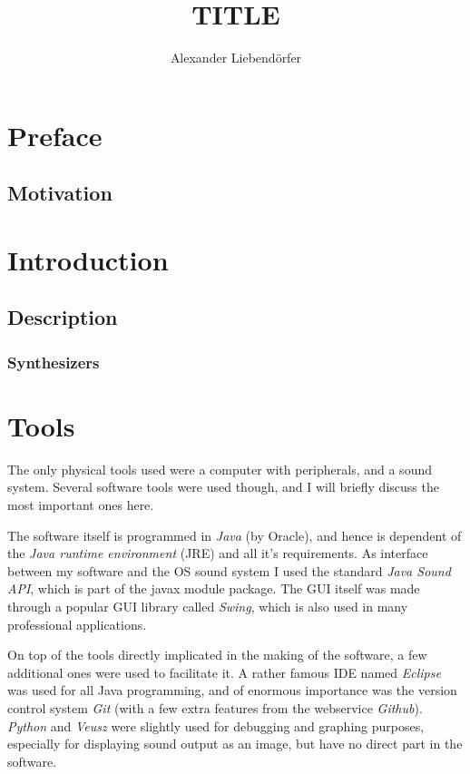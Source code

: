 \documentclass[11pt,a4paper]{article}
\title{\LARGE \textbf {TITLE} \vspace{1em}}
\author{Alexander Liebend\"{o}rfer}
\begin{document}
\maketitle
\clearpage
\tableofcontents

\clearpage

\section{Preface}

\subsection{Motivation}

\section{Introduction}

\subsection{Description}

\subsubsection{Synthesizers}

\section{Tools}

The only physical tools used were a computer with peripherals, and a sound system. Several software tools were used though, and I will briefly discuss the most important ones here.

The software itself is programmed in \emph{Java} (by Oracle), and hence is dependent of the \emph{Java runtime environment} (JRE) and all it's requirements. As interface between my software and the OS sound system I used the standard \emph{Java Sound API}, which is part of the javax module package. The GUI itself was made through a popular GUI library called \emph{Swing}, which is also used in many professional applications.

On top of the tools directly implicated in the making of the software, a few additional ones were used to fac‎ilitate it. A rather famous IDE named \emph{Eclipse} was used for all Java programming, and of enormous importance was the version control system \emph{Git} (with a few extra features from the webservice \emph{Github}). \emph{Python} and \emph{Veusz} were slightly used for debugging and graphing purposes, especially for displaying sound output as an image, but have no direct part in the software.
\end{document}
